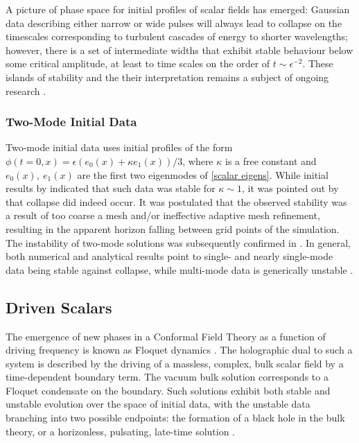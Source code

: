\documentclass[../PhD.tex]{subfiles}
\begin{document}
A picture of phase space for initial profiles of scalar fields has emerged: Gaussian data describing either narrow or wide pulses will always lead to collapse on the timescales corresponding to turbulent cascades of energy to shorter wavelengths; however, there is a set of intermediate widths that exhibit stable behaviour below some critical amplitude, at least to time scales on the order of $t \sim \epsilon^{-2}$. These islands of stability and the their interpretation remains a subject of ongoing research \cite{1507.08261, TTF, 1706.07413, 1803.02830, 1912.07143}.

\subsubsection{Two-Mode Initial Data}

Two-mode initial data uses initial profiles of the form $\phi(t=0,x) = \epsilon ( e_0 (x) + \kappa e_1 (x) )/3$, where $\kappa$ is a free constant and $e_0(x), \: e_1(x)$ are the first two eigenmodes of \eqref{scalar eigens}. While initial results by \cite{1403.6471} indicated that such data was stable for $\kappa \sim 1$, it was pointed out by \cite{1410.2631} that  collapse did indeed occur. It was postulated that the observed stability was a result of too coarse a mesh and/or ineffective adaptive mesh refinement, resulting in the apparent horizon falling between grid points of the simulation. The instability of two-mode solutions was subsequently confirmed in \cite{1508.02709}. In general, both numerical and analytical results point to single- and nearly single-mode data being stable against collapse, while multi-mode data is generically unstable \cite{1311.7409, 1211.7076, 1512.00349, 1509.00232, 1512.04383, 1504.05203, 1904.02168}.


\subsection{Driven Scalars}

The emergence of new phases in a Conformal Field Theory as a function of driving frequency is known as Floquet dynamics \cite{1805.00031, 1802.05285}. The holographic dual to such a system is described by the driving of a massless, complex, bulk scalar field by a time-dependent boundary term. The vacuum bulk solution corresponds to a Floquet condensate on the boundary. Such solutions exhibit both stable and unstable evolution over the space of initial data, with the unstable data branching into two possible endpoints: the formation of a black hole in the bulk theory, or a horizonless, pulsating, late-time solution \cite{1712.07637}.
\end{document}
